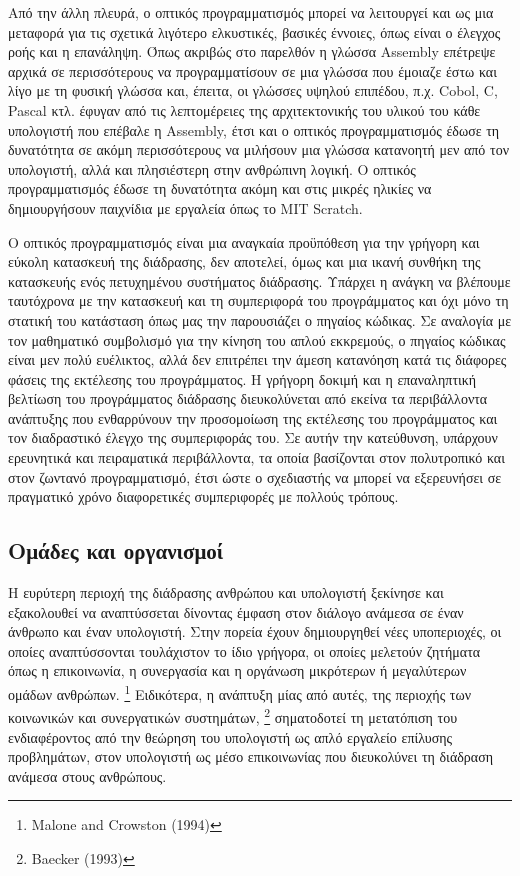 \documentclass[
]{article}
\begin{document}
Από την άλλη πλευρά, ο οπτικός προγραμματισμός μπορεί να λειτουργεί και
ως μια μεταφορά για τις σχετικά λιγότερο ελκυστικές, βασικές έννοιες,
όπως είναι ο έλεγχος ροής και η επανάληψη. Όπως ακριβώς στο παρελθόν η
γλώσσα Assembly επέτρεψε αρχικά σε περισσότερους να προγραμματίσουν σε
μια γλώσσα που έμοιαζε έστω και λίγο με τη φυσική γλώσσα και, έπειτα, οι
γλώσσες υψηλού επιπέδου, π.χ. Cobol, C, Pascal κτλ. έφυγαν από τις
λεπτομέρειες της αρχιτεκτονικής του υλικού του κάθε υπολογιστή που
επέβαλε η Assembly, έτσι και ο οπτικός προγραμματισμός έδωσε τη
δυνατότητα σε ακόμη περισσότερους να μιλήσουν μια γλώσσα κατανοητή μεν
από τον υπολογιστή, αλλά και πλησιέστερη στην ανθρώπινη λογική. Ο
οπτικός προγραμματισμός έδωσε τη δυνατότητα ακόμη και στις μικρές
ηλικίες να δημιουργήσουν παιχνίδια με εργαλεία όπως το MIT Scratch.

Ο οπτικός προγραμματισμός είναι μια αναγκαία προϋπόθεση για την γρήγορη
και εύκολη κατασκευή της διάδρασης, δεν αποτελεί, όμως και μια ικανή
συνθήκη της κατασκευής ενός πετυχημένου συστήματος διάδρασης. Υπάρχει η
ανάγκη να βλέπουμε ταυτόχρονα με την κατασκευή και τη συμπεριφορά του
προγράμματος και όχι μόνο τη στατική του κατάσταση όπως μας την
παρουσιάζει ο πηγαίος κώδικας. Σε αναλογία με τον μαθηματικό συμβολισμό
για την κίνηση του απλού εκκρεμούς, ο πηγαίος κώδικας είναι μεν πολύ
ευέλικτος, αλλά δεν επιτρέπει την άμεση κατανόηση κατά τις διάφορες
φάσεις της εκτέλεσης του προγράμματος. Η γρήγορη δοκιμή και η
επαναληπτική βελτίωση του προγράμματος διάδρασης διευκολύνεται από
εκείνα τα περιβάλλοντα ανάπτυξης που ενθαρρύνουν την προσομοίωση της
εκτέλεσης του προγράμματος και τον διαδραστικό έλεγχο της συμπεριφοράς
του. Σε αυτήν την κατεύθυνση, υπάρχουν ερευνητικά και πειραματικά
περιβάλλοντα, τα οποία βασίζονται στον πολυτροπικό και στον ζωντανό
προγραμματισμό, έτσι ώστε ο σχεδιαστής να μπορεί να εξερευνήσει σε
πραγματικό χρόνο διαφορετικές συμπεριφορές με πολλούς τρόπους.

\hypertarget{ux3bfux3bcux3acux3b4ux3b5ux3c2-ux3baux3b1ux3b9-ux3bfux3c1ux3b3ux3b1ux3bdux3b9ux3c3ux3bcux3bfux3af}{%
\subsection{Ομάδες και
οργανισμοί}\label{ux3bfux3bcux3acux3b4ux3b5ux3c2-ux3baux3b1ux3b9-ux3bfux3c1ux3b3ux3b1ux3bdux3b9ux3c3ux3bcux3bfux3af}}

Η ευρύτερη περιοχή της διάδρασης ανθρώπου και υπολογιστή ξεκίνησε και
εξακολουθεί να αναπτύσσεται δίνοντας έμφαση στον διάλογο ανάμεσα σε έναν
άνθρωπο και έναν υπολογιστή. Στην πορεία έχουν δημιουργηθεί νέες
υποπεριοχές, οι οποίες αναπτύσσονται τουλάχιστον το ίδιο γρήγορα, οι
οποίες μελετούν ζητήματα όπως η επικοινωνία, η συνεργασία και η οργάνωση
μικρότερων ή μεγαλύτερων ομάδων ανθρώπων. \footnote{Malone and Crowston
  (1994)} Ειδικότερα, η ανάπτυξη μίας από αυτές, της περιοχής των
κοινωνικών και συνεργατικών συστημάτων, \footnote{Baecker (1993)}
σηματοδοτεί τη μετατόπιση του ενδιαφέροντος από την θεώρηση του
υπολογιστή ως απλό εργαλείο επίλυσης προβλημάτων, στον υπολογιστή ως
μέσο επικοινωνίας που διευκολύνει τη διάδραση ανάμεσα στους ανθρώπους.
\end{document}
